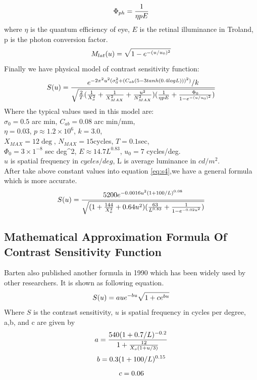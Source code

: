 \documentclass{article}
\begin{document}
\begin{equation}
    \centering
    \label{eq:Phi_ph}
    \Phi_{ph} = \frac{1}{\eta pE}
\end{equation}
where $\eta$ is the quantum efficiency of eye, $E$ is the retinal illuminance in Troland, p is the photon conversion factor.
\begin{equation}
    \centering
    \label{eq:M_lat}
    M_{lat}(u) = \sqrt{1 - e^{-(u/u_0)^2}}
\end{equation}
Finally we have physical model of contrast sensitivity function: 
\begin{equation}
    \centering
    \label{eq:s4}
     S(u) = \frac{e^{-2\pi^2u^2(\sigma_0^2+(C_{ab}(5-3tanh(0.4logL)))^2)}/k}{\sqrt{\frac{2}{T}(\frac{1}{X_o^2}+\frac{1}{X_{MAX}^2}+\frac{u^2}{N_{MAX}^2})(\frac{1}{\eta pE}+\frac{\Phi_0}{1 - e^{-(u/u_0)^2}})}}
\end{equation}
Where the typical values used in this model are:\\
$\sigma_0 = 0.5$ arc min,  $C_{ab}=0.08$ arc min/mm, \\
$\eta = 0.03$, $p \approx 1.2\times10^6$, $k = 3.0$,\\
$X_{MAX} = 12\deg$, $N_{MAX}=15$cycles, $T = 0.1$sec,\\
$\Phi_0=3\times1^{-8}$ sec deg^2, $E \approx 14.7L^0.83$, $u_0=7$ cycles/deg.\\
$u$ is spatial frequency in $cycles/deg$, L is average luminance in $cd/{m^2}$. \\
After take above constant values into equation \eqref{eq:s4},we have a general formula which is more accurate.
\begin{equation}
    \centering
    \label{eq:s5}
     S(u) = \frac{5200e^{-0.0016u^2(1+100/L)^{0.08}}}{\sqrt{(1+\frac{144}{X_o^2}+0.64u^2)(\frac{63}{L^{0.83}}+\frac{1}{1-e^{-0.02u^2}})}}
\end{equation}

\subsection{Mathematical Approximation Formula Of Contrast Sensitivity Function}
Barten also published another formula in 1990 which has been widely used by other researchers.
It is shown as following equation.\\
\begin{equation}
    \centering
    \label{eq:barten1990}
     S(u) = aue^{-bu}\sqrt{1+ce^{bu}}
\end{equation}
Where $S$ is the contrast sensitivity, $u$ is spatial frequency in cycles per degree, a,b, and c are given by
\begin{equation}
    \centering
    \label{eq:a}
     a = \frac{540(1+0.7/L)^{-0.2}}{1+\frac{12}{X_o(1+u/3)}}
\end{equation}
\begin{equation}
    \centering
    \label{eq:b}
     b = 0.3(1+100/L)^{0.15}
\end{equation}
\begin{equation}
    \centering
    \label{eq:c}
     c = 0.06
\end{equation}
\end{document}
